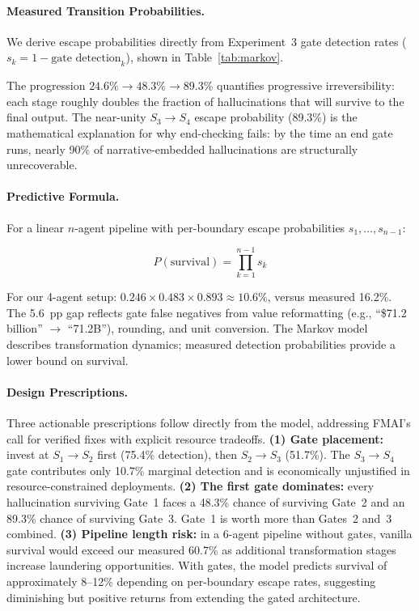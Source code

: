 \documentclass{article}
\theoremstyle{plain}
\theoremstyle{definition}
\theoremstyle{remark}
\begin{document}
\paragraph{Measured Transition Probabilities.} We derive escape probabilities directly from Experiment~3 gate detection rates ($s_k = 1 - \text{gate detection}_k$), shown in Table~\ref{tab:markov}.

The progression $24.6\% \to 48.3\% \to 89.3\%$ quantifies progressive irreversibility: each stage roughly doubles the fraction of hallucinations that will survive to the final output. The near-unity $S_3{\to}S_4$ escape probability (89.3\%) is the mathematical explanation for why end-checking fails: by the time an end gate runs, nearly 90\% of narrative-embedded hallucinations are structurally unrecoverable.

\paragraph{Predictive Formula.} For a linear $n$-agent pipeline with 
per-boundary escape probabilities $s_1, \ldots, s_{n-1}$:

$$P(\text{survival}) = \prod_{k=1}^{n-1} s_k$$

For our 4-agent setup: $0.246 \times 0.483 \times 0.893 \approx 10.6\%$, versus measured 16.2\%. The 5.6~pp gap reflects gate false negatives from value reformatting (e.g., ``\$71.2 billion'' $\to$ ``71.2B''), rounding, and unit conversion. The Markov model describes transformation dynamics; measured detection probabilities provide a lower bound on survival.

\paragraph{Design Prescriptions.} Three actionable prescriptions follow directly from the model, addressing FMAI's call for verified fixes with explicit resource tradeoffs. \textbf{(1) Gate placement:} invest at $S_1{\to}S_2$ first (75.4\% detection), then $S_2{\to}S_3$ (51.7\%). The $S_3{\to}S_4$ gate contributes only 10.7\% marginal detection and is economically unjustified in resource-constrained deployments. \textbf{(2) The first gate dominates:} every hallucination surviving Gate~1 faces a 48.3\% chance of surviving Gate~2 and an 89.3\% chance of surviving Gate~3. Gate~1 is worth more than Gates~2 and~3 combined. \textbf{(3) Pipeline length risk:} in a 6-agent pipeline without gates, vanilla survival would exceed our measured 60.7\% as additional transformation stages increase laundering opportunities. With gates, the model predicts survival of approximately 8--12\% depending on per-boundary escape rates, suggesting diminishing but positive returns from extending the gated architecture.
\end{document}
